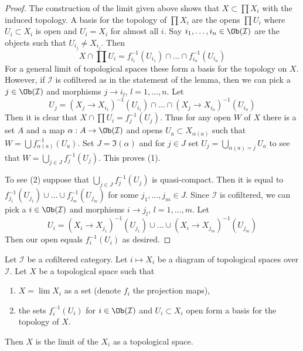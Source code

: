 \begin{proof}
The construction of the limit given above shows that $X \subset \prod X_i$
with the induced topology. A basis for the topology of $\prod X_i$ are
the opens $\prod U_i$ where $U_i \subset X_i$ is open and $U_i = X_i$
for almost all $i$. Say $i_1, \ldots, i_n \in \Ob(\mathcal{I})$ are the
objects such that $U_{i_j} \not = X_{i_j}$. Then
$$
X \cap \prod U_i = f_{i_1}^{-1}(U_{i_1}) \cap \ldots \cap f_{i_n}^{-1}(U_{i_n})
$$
For a general limit of topological spaces these form a basis for the
topology on $X$. However, if $\mathcal{I}$ is cofiltered as in the statement
of the lemma, then we can pick a $j \in \Ob(\mathcal{I})$ and morphisms
$j \to i_l$, $l = 1, \ldots, n$. Let
$$
U_j =
(X_j \to X_{i_1})^{-1}(U_{i_1}) \cap \ldots \cap
(X_j \to X_{i_n})^{-1}(U_{i_n})
$$
Then it is clear that $X \cap \prod U_i = f_j^{-1}(U_j)$. Thus for any open
$W$ of $X$ there is a set $A$ and a map $\alpha : A \to \Ob(\mathcal{I})$ and
opens $U_a \subset X_{\alpha(a)}$ such that
$W = \bigcup f_{\alpha(a)}^{-1}(U_a)$. Set $J = \Im(\alpha)$ and
for $j \in J$ set $U_j = \bigcup_{\alpha(a) = j} U_a$ to see that
$W = \bigcup_{j \in J} f_j^{-1}(U_j)$.
This proves (1).

\medskip\noindent
To see (2) suppose that $\bigcup_{j \in J} f_j^{-1}(U_j)$ is quasi-compact.
Then it is equal to
$f_{j_1}^{-1}(U_{j_1}) \cup \ldots \cup f_{j_m}^{-1}(U_{j_m})$
for some $j_1, \ldots, j_m \in J$. Since $\mathcal{I}$ is cofiltered,
we can pick a $i \in \Ob(\mathcal{I})$ and morphisms
$i \to j_l$, $l = 1, \ldots, m$. Let
$$
U_i =
(X_i \to X_{j_1})^{-1}(U_{j_1}) \cup \ldots \cup
(X_i \to X_{j_m})^{-1}(U_{j_m})
$$
Then our open equals $f_i^{-1}(U_i)$ as desired. 
\end{proof}

\begin{lemma}
\label{lemma-characterize-limit}
Let $\mathcal{I}$ be a cofiltered category. Let $i \mapsto X_i$ be a diagram
of topological spaces over $\mathcal{I}$. Let $X$ be a topological
space such that
\begin{enumerate}
\item $X = \lim X_i$ as a set (denote $f_i$ the projection maps),
\item the sets $f_i^{-1}(U_i)$ for $i \in \Ob(\mathcal{I})$ and
$U_i \subset X_i$ open form a basis for the topology of $X$.
\end{enumerate}
Then $X$ is the limit of the $X_i$ as a topological space.
\end{lemma}

